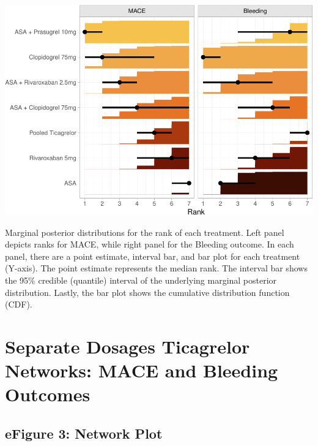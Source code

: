 \documentclass[
  12pt,
]{article}
\begin{document}
\begin{center}\includegraphics{03_supplementary_files/figure-latex/unnamed-chunk-17-1} \end{center}

Marginal posterior distributions for the rank of each treatment. Left
panel depicts ranks for MACE, while right panel for the Bleeding
outcome. In each panel, there are a point estimate, interval bar, and
bar plot for each treatment (Y-axis). The point estimate represents the
median rank. The interval bar shows the 95\% credible (quantile)
interval of the underlying marginal posterior distribution. Lastly, the
bar plot shows the cumulative distribution function (CDF).

\hypertarget{separate-dosages-ticagrelor-networks-mace-and-bleeding-outcomes}{%
\section{Separate Dosages Ticagrelor Networks: MACE and Bleeding
Outcomes}\label{separate-dosages-ticagrelor-networks-mace-and-bleeding-outcomes}}

\hypertarget{efigure-3-network-plot}{%
\subsection{eFigure 3: Network Plot}\label{efigure-3-network-plot}}
\end{document}
